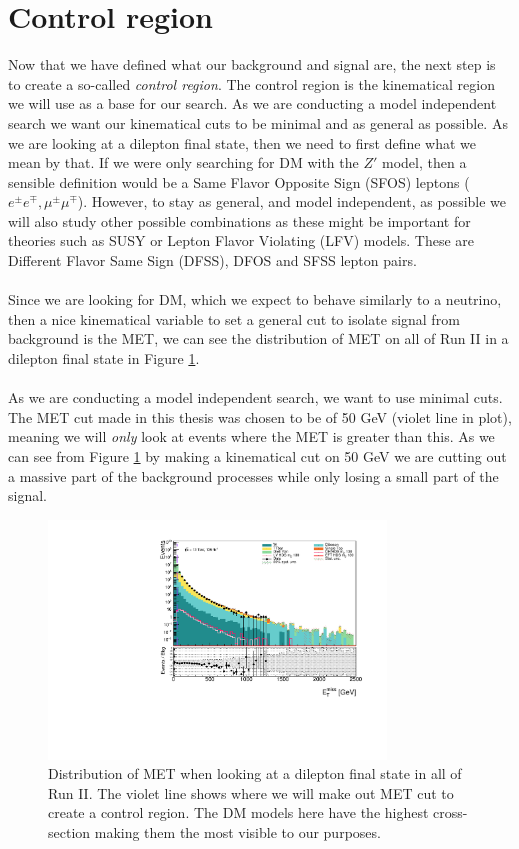 \documentclass[12pt, a4paper]{book}
\begin{document}
\section{Control region}
Now that we have defined what our background and signal are, the next step is to create a so-called \textit{control region}. The control region is the kinematical region we will use as a base for our search. As we are conducting a model independent search we want 
our kinematical cuts to be minimal and as general as possible. As we are looking at a dilepton final state, then we need to first define what we mean by that. If we were only searching for DM with the $Z'$ model, then a sensible definition would be a 
Same Flavor Opposite Sign (SFOS) leptons ($e^\pm e^\mp, \mu^\pm\mu^\mp$). However, to stay as general, and model independent, as possible we will also study other possible combinations as these might be important for theories such as SUSY or Lepton Flavor Violating 
(LFV) models. These are Different Flavor Same Sign (DFSS), DFOS and SFSS lepton pairs.\\
\\Since we are looking for DM, which we expect to behave similarly to a neutrino, then a nice kinematical variable to set a general cut to isolate signal from background is the MET, we can see the 
distribution of MET on all of Run II in a dilepton final state in Figure \ref{fig:uncut_met}.\\
\\As we are conducting a model independent search, we want to use minimal cuts. The MET cut made in this thesis was chosen to be of 50 GeV (violet line in plot), meaning we will \textit{only} look at events where the MET is greater than this. As we can see from Figure \ref{fig:uncut_met} 
by making a kinematical cut on 50 GeV we are cutting out a massive part of the background processes while only losing a small part of the signal. \\
\graphicspath{{../../../Plots/Data_Analysis/SRs/Uncut/}} 
\begin{figure}[!ht]
    \centering
    \includegraphics[width=0.8\textwidth]{met.pdf}
    \caption[$E_T^{miss}$ distribution in dilepton final state Run II]{Distribution of MET when looking at a dilepton final state in all of Run II. The violet line shows where we will make out MET cut to create a control region. The DM models here have the highest cross-section making them the most visible to our purposes.}\label{fig:uncut_met}
\end{figure}
\end{document}

